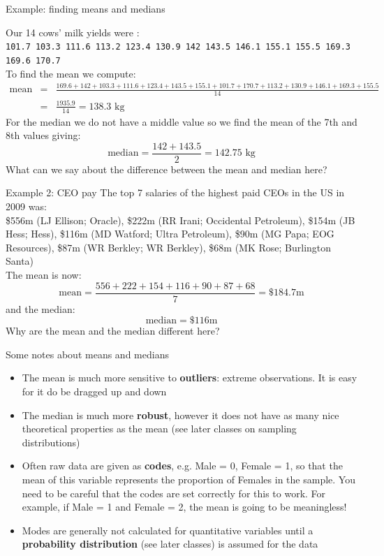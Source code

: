 \documentclass[12pt,xcolor=dvipsnames,handout,mathserif,aspectratio=169]{beamer}
\newcommand{\bbl}[1]{{\color{NavyBlue} \textbf{#1}}}
\newcommand{\bre}[1]{{\color{red} \textbf{#1}}}
\newcommand{\bgr}[1]{{\color{PineGreen} \textbf{#1}}}
\begin{document}
\begin{frame}{Example: finding means and medians}

Our 14 cows' milk yields were :\\
\texttt{101.7 103.3 111.6 113.2 123.4 130.9 142 143.5 146.1 155.1 155.5 169.3 169.6 170.7}\\
\pause
To find the mean we compute:\\
\tiny
\begin{eqnarray*}
\mbox{mean} &=& \frac{169.6 + 142 + 103.3 + 111.6 + 123.4 + 143.5 + 155.1 + 101.7 + 170.7 + 113.2 + 130.9 + 146.1 + 169.3 + 155.5}{14}\\
 &=& \frac{1935.9}{14} =  138.3\mbox{ kg}
\end{eqnarray*}
\normalsize
\pause
For the median we do not have a middle value so we find the mean of the 7th and 8th values giving:
$$\mbox{median} = \frac{142 + 143.5}{2} = 142.75\mbox{ kg}$$
\pause
What can we say about the difference between the mean and median here?
\end{frame}

\begin{frame}{ Example 2: CEO pay }
The top 7 salaries of the highest paid CEOs in the US in 2009 was:\\
\$556m (LJ Ellison; Oracle), \$222m (RR Irani; Occidental Petroleum), \$154m (JB Hess; Hess), \$116m (MD Watford; Ultra Petroleum), \$90m (MG Papa; EOG Resources), \$87m (WR Berkley; WR Berkley), \$68m (MK Rose; Burlington Santa)\\
\vspace{0.2cm}
\pause
The mean is now:
$$\mbox{mean} = \frac{556 + 222 + 154 + 116 + 90 + 87 + 68}{7} = \$184.7\mbox{m}$$
and the median:
$$ \mbox{median} = \$116\mbox{m}$$
\pause
Why are the mean and the median different here?
\end{frame}

\begin{frame}{ Some notes about means and medians }

\begin{itemize}
\item The mean is much more sensitive to \bre{outliers}: extreme observations. It is easy for it do be dragged up and down
\pause
\item The median is much more \bgr{robust}, however it does not have as many nice theoretical properties as the mean (see later classes on sampling distributions)
\pause
\item Often raw data are given as \bbl{codes}, e.g. Male = 0, Female = 1, so that the mean of this variable represents the proportion of Females in the sample. You need to be careful that the codes are set correctly for this to work. For example, if Male = 1 and Female = 2, the mean is going to be meaningless! 
\pause
\item Modes are generally not calculated for quantitative variables until a \textbf{probability distribution} (see later classes) is assumed for the data
\end{itemize}

\end{frame}
\end{document}
